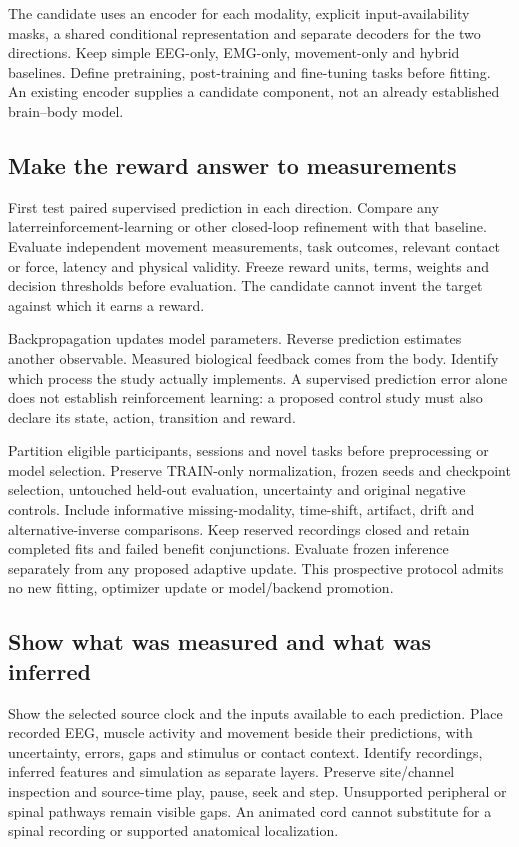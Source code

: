 The candidate uses an encoder for each modality, explicit input-availability
masks, a shared conditional representation and separate decoders for the two
directions. Keep simple EEG-only, EMG-only, movement-only and hybrid baselines.
Define pretraining, post-training and fine-tuning tasks before fitting. An
existing encoder supplies a candidate component, not an already established
brain--body model.

\subsection{Make the reward answer to measurements}

First test paired supervised prediction in each direction. Compare any later\linebreak[4]
reinforcement-learning or other closed-loop refinement with that baseline.
Evaluate independent movement measurements, task outcomes, relevant contact or
force, latency and physical validity. Freeze reward units, terms, weights and
decision thresholds before evaluation. The candidate cannot invent the target
against which it earns a reward.

Backpropagation updates model parameters. Reverse prediction estimates another
observable. Measured biological feedback comes from the body. Identify which
process the study actually implements. A supervised prediction error alone does
not establish reinforcement learning: a proposed control study must also declare
its state, action, transition and reward.

Partition eligible participants, sessions and novel tasks before preprocessing
or model selection. Preserve TRAIN-only normalization, frozen seeds and
checkpoint selection, untouched held-out evaluation, uncertainty and original
negative controls. Include informative missing-modality, time-shift, artifact,
drift and alternative-inverse comparisons. Keep reserved recordings closed and
retain completed fits and failed benefit conjunctions. Evaluate frozen inference
separately from any proposed adaptive update. This prospective protocol admits
no new fitting, optimizer update or model/backend promotion.

\subsection{Show what was measured and what was inferred}

Show the selected source clock and the inputs available to each prediction.
Place recorded EEG, muscle activity and movement beside their predictions, with
uncertainty, errors, gaps and stimulus or contact context. Identify recordings,
inferred features and simulation as separate layers. Preserve site/channel
inspection and source-time play, pause, seek and step. Unsupported peripheral
or spinal pathways remain visible gaps. An animated cord cannot substitute for
a spinal recording or supported anatomical localization.